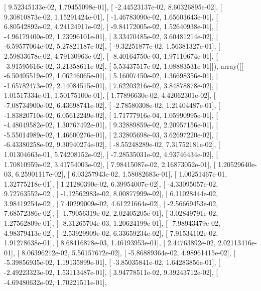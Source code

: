 \documentclass{article}
\begin{document}
       [  9.52345133e-02,   1.79455098e-01],
       [ -2.44523137e-02,   8.60326895e-02],
       [  9.30810873e-02,   1.15291424e-01],
       [ -1.46783090e-02,   1.65603643e-01],
       [  6.80542892e-02,   4.24124911e-02],
       [ -9.84172005e-02,   1.52640938e-01],
       [ -4.96179400e-02,   1.23996101e-01],
       [  3.33470485e-02,   3.60481214e-02],
       [ -6.59577064e-02,   5.27821187e-02],
       [ -9.32251877e-02,   1.56381327e-01],
       [  2.59833678e-02,   4.79130963e-02],
       [ -8.40164750e-03,   1.97110674e-01],
       [ -3.91595616e-02,   3.21358611e-02],
       [  5.53437517e-02,   1.08883531e-01]]), array([[ -6.50405519e-02,   1.06246065e-01],
       [  5.16007450e-02,   1.36698356e-01],
       [ -1.65782473e-02,   2.14084515e-01],
       [  7.62203216e-02,   3.84878878e-02],
       [  1.01517334e-01,   1.50175100e-01],
       [  1.77896630e-02,   4.42062301e-02],
       [ -7.08734900e-02,   6.43698741e-02],
       [ -2.78580308e-02,   1.21404487e-01],
       [ -1.83820710e-02,   6.05612249e-02],
       [  1.71777916e-04,   1.05990995e-01],
       [ -4.48049582e-02,   1.30767492e-01],
       [  9.32889859e-02,   2.20957156e-01],
       [ -5.55014989e-02,   1.46600276e-01],
       [  2.32805698e-03,   3.62697220e-02],
       [ -6.43380258e-02,   9.30940274e-02],
       [ -8.55248289e-02,   7.31752181e-02],
       [  1.01304663e-01,   5.74208152e-02],
       [ -7.28535031e-02,   4.93746434e-02],
       [  1.70810959e-02,   3.41754003e-02],
       [  7.98415087e-02,   2.16873052e-01],
       [  1.20529640e-03,   6.25901117e-02],
       [  6.03257943e-02,   1.58082683e-01],
       [  1.00251467e-01,   1.32775218e-01],
       [  1.21280390e-02,   6.39954007e-02],
       [ -4.33095057e-02,   9.72763552e-02],
       [ -1.12562983e-02,   8.00877999e-02],
       [  6.11028444e-02,   3.98419254e-02],
       [  7.40299009e-02,   4.61221664e-02],
       [ -2.56669453e-02,   7.68572386e-02],
       [ -1.79056319e-02,   2.02405205e-01],
       [  3.02849791e-02,   1.27562809e-01],
       [ -8.31265704e-03,   1.20624199e-01],
       [ -7.98943479e-02,   4.98379413e-02],
       [ -2.53929909e-02,   6.33659234e-02],
       [  7.91534102e-02,   1.91278638e-01],
       [  8.68416878e-03,   1.46193953e-01],
       [  2.44763892e-02,   2.02113416e-01],
       [  8.06396212e-02,   5.56157672e-02],
       [ -5.86889364e-02,   4.98961415e-02],
       [ -5.39856935e-02,   1.19135899e-01],
       [ -3.85035841e-02,   1.64283856e-01],
       [ -2.49223323e-02,   1.53113487e-01],
       [  3.94778511e-02,   9.39243712e-02],
       [ -4.69480632e-02,   1.70221511e-01],
\end{document}
